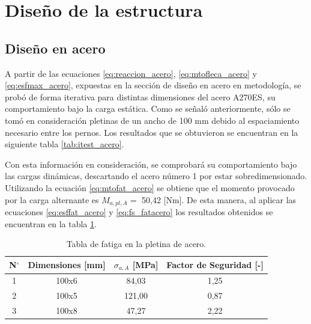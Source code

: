 \section{Diseño de la estructura}
\subsection{Diseño en acero}
A partir de las ecuaciones \ref{eq:reaccion_acero}, \ref{eq:mtofleca_acero} y \ref{eq:esfmax_acero}, expuestas en la sección de diseño en acero en metodología, se probó de forma iterativa para distintas dimensiones del acero A270ES, su comportamiento bajo la carga estática. Como se señaló anteriormente, sólo se tomó en consideración pletinas de un ancho de 100 mm debido al espaciamiento necesario entre los pernos. Los resultados que se obtuvieron se encuentran en la siguiente tabla \ref{tab:itest_acero}.

\begin{table}[h]
\centering
{}
\caption{Tabla aceros}
\label{tab:itest_acero}
\end{table}

Con esta información en consideración, se comprobará su comportamiento bajo las cargas dinámicas, descartando el acero número 1 por estar sobredimensionado. Utilizando la ecuación \ref{eq:mtofat_acero} se obtiene que el momento provocado por la carga alternante es $M_{a,pl,A} =$ 50,42 [Nm]. De esta manera, al aplicar las ecuaciones \ref{eq:esffat_acero} y \ref{eq:fs_fatacero} los resultados obtenidos se encuentran en la tabla \ref{tab:itfat_acero}.

\begin{table}[h]
\centering
\begin{tabular}{@{}cccc@{}}
\toprule
N$^{\circ}$ & Dimensiones [mm] & $\sigma_{a,A}$ [MPa] & Factor de Seguridad [-] \\ \midrule
1 & 100x6 & 84,03 & 1,25 \\
2 & 100x5 & 121,00 & 0,87 \\
3 & 100x8 & 47,27 & 2,22 \\ \bottomrule
\end{tabular}
\caption{Tabla de fatiga en la pletina de acero.}
\label{tab:itfat_acero}
\end{table}

